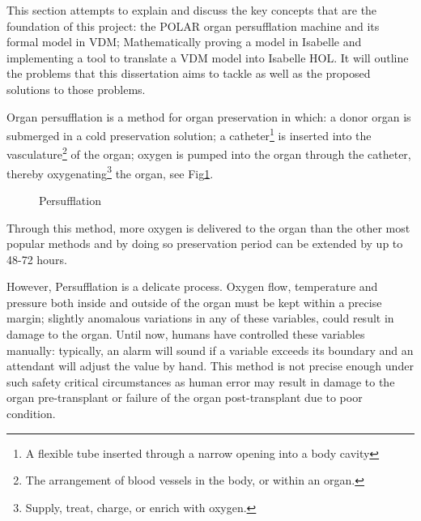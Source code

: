 This section attempts to explain and discuss the key concepts that are the foundation of this project: the POLAR organ persufflation machine and its formal model in VDM; Mathematically proving a model in Isabelle and implementing a tool to translate a VDM model into Isabelle HOL. It will outline the problems that this dissertation aims to tackle as well as the proposed solutions to those problems.

Organ persufflation is a method for organ preservation in which: a donor organ is submerged in a cold preservation solution; a catheter\footnote{A flexible tube inserted through a narrow opening into a body cavity} is inserted into the vasculature\footnote{The arrangement of blood vessels in the body, or within an organ.} of the organ; oxygen is pumped into the organ through the catheter, thereby oxygenating\footnote{Supply, treat, charge, or enrich with oxygen.} the organ, see Fig\ref{fig:Persufflation}.\begin{figure}
        \caption{\label{fig:Persufflation} Persufflation \parencite{Dholakia2018}}
      \end{figure} Through this method, more oxygen is delivered to the organ than the other most popular methods and by doing so preservation period can be extended by up to 48-72 hours\parencite{Suszynski2013}. 

However, Persufflation is a delicate process. Oxygen flow, temperature and pressure both inside and outside of the organ must be kept within a precise margin; slightly anomalous variations in any of these variables, could result in damage to the organ. 
Until now, humans have controlled these variables manually: typically, an alarm will sound if a variable exceeds its boundary and an attendant will adjust the value by hand. This method is not precise enough under such safety critical circumstances as human error may result in damage to the organ pre-transplant or failure of the organ post-transplant due to poor condition.

